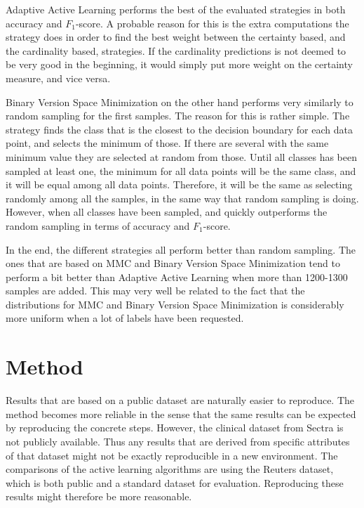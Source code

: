 Adaptive Active Learning performs the best of the evaluated strategies in both accuracy and $F_1$-score. 
A probable reason for this is the extra computations the strategy does in order to find the best weight between the certainty based, and the cardinality based, strategies.
If the cardinality predictions is not deemed to be very good in the beginning, it would simply put more weight on the certainty measure, and vice versa.

Binary Version Space Minimization on the other hand performs very similarly to random sampling for the first samples.
The reason for this is rather simple.
The strategy finds the class that is the closest to the decision boundary for each data point, and selects the minimum of those.
If there are several with the same minimum value they are selected at random from those.
Until all classes has been sampled at least one, the minimum for all data points will be the same class, and it will be equal among all data points.
Therefore, it will be the same as selecting randomly among all the samples, in the same way that random sampling is doing.
However, when all classes have been sampled, and quickly outperforms the random sampling in terms of accuracy and $F_1$-score.

In the end, the different strategies all perform better than random sampling.
The ones that are based on MMC and Binary Version Space Minimization tend to perform a bit better than Adaptive Active Learning when more than 1200-1300 samples are added.
This may very well be related to the fact that the distributions for MMC and Binary Version Space Minimization is considerably more uniform when a lot of labels have been requested.



\section{Method}
\label{sec:discussion-method}

Results that are based on a public dataset are naturally easier to reproduce.
The method becomes more reliable in the sense that the same results can be expected by reproducing the concrete steps.
However, the clinical dataset from Sectra is not publicly available.
Thus any results that are derived from specific attributes of that dataset might not be exactly reproducible in a new environment.
The comparisons of the active learning algorithms are using the Reuters dataset, which is both public and a standard dataset for evaluation.
Reproducing these results might therefore be more reasonable.

